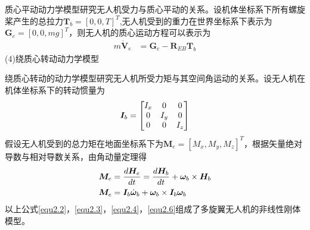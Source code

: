 质心平动动力学模型研究无人机受力与质心平动的关系。设机体坐标系下所有螺旋桨产生的总拉力$\boldsymbol{T}_b=[0,0,T]^{T}$,无人机受到的重力在世界坐标系下表示为$\boldsymbol{G}_e=[0,0,mg]^T$，则无人机的质心运动方程可以表示为
\begin{equation}
\label{equ2.4}
\begin{aligned}
m\boldsymbol{\dot{V}}_e &= \boldsymbol{G}_e -  \boldsymbol{R}_{EB} \boldsymbol{T}_b
\end{aligned}
\end{equation}
(4)绕质心转动动力学模型

绕质心转动的动力学模型研究无人机所受力矩与其空间角运动的关系。设无人机在机体坐标系下的转动惯量为
\begin{equation}
\label{equ2.5}
\boldsymbol{I}_b = 
\begin{bmatrix}
I_x & 0 & 0 \cr
0 & I_y & 0 \cr
0 & 0 & I_z \cr
\end{bmatrix}
\end{equation}
假设无人机受到的总力矩在地面坐标系下为$\boldsymbol{M}_e=[M_x,M_y,M_z]^T$，根据矢量绝对导数与相对导数关系，由角动量定理得
\begin{equation}
\label{equ2.6}
\begin{aligned}
\boldsymbol{M}_e &= {d\boldsymbol{H}_e \over dt} = {d\boldsymbol{H}_b \over dt} +  \boldsymbol{\omega}_b \times \boldsymbol{H}_b 
\\
\boldsymbol{M}_e &= \boldsymbol{I}_b \dot{\boldsymbol{\omega}}_b +\boldsymbol{\omega}_b \times \boldsymbol{I}_b \boldsymbol{\omega}_b 
\end{aligned}
\end{equation}
以上公式\eqref{equ2.2}，\eqref{equ2.3}，\eqref{equ2.4}，\eqref{equ2.6}组成了多旋翼无人机的非线性刚体模型。

